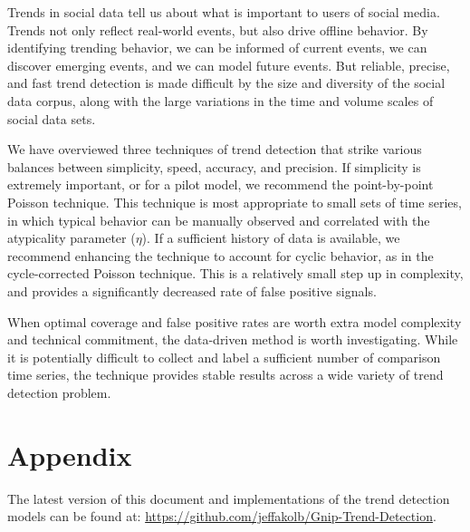 \documentclass{article}
\begin{document}
Trends in social data tell us about what is important to users of social media.
Trends not only reflect real-world events, but also drive offline behavior. By
identifying trending behavior, we can be informed of current events, we can
discover emerging events, and we can model future events. But reliable,
precise, and fast trend detection is made difficult by the size and diversity
of the social data corpus, along with the large variations in the time and
volume scales of social data sets. 

We have overviewed three techniques of trend detection that strike various
balances between simplicity, speed, accuracy, and precision.
If simplicity is extremely important, or for a pilot model, we
recommend the point-by-point Poisson technique. This technique is most
appropriate to small sets of time series, in which typical behavior can be
manually observed and correlated with the atypicality parameter ($\eta$). If a 
sufficient history of data is available, we recommend enhancing the technique
to account for cyclic behavior, as in the cycle-corrected Poisson technique.
This is a relatively small step up in complexity, and provides a significantly
decreased rate of false positive signals. 

When optimal coverage and false positive rates are worth extra model complexity
and technical commitment, the data-driven method is worth investigating. While it
is potentially difficult to collect and label a sufficient number of comparison
time series, the technique provides stable results across a wide variety of
trend detection problem. 


\appendix
\section{Appendix}
The latest version of this document 
and implementations of the trend detection models 
can be found at:
\noindent \url{https://github.com/jeffakolb/Gnip-Trend-Detection}.

%

\end{document}
